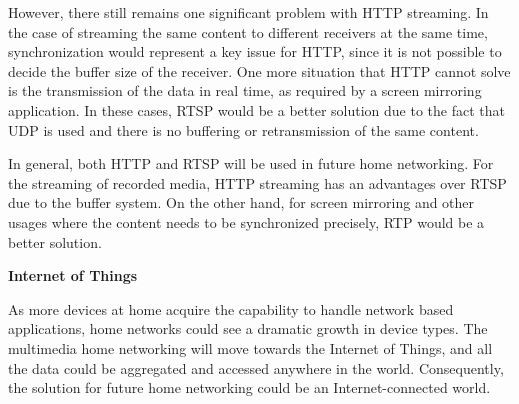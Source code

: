 However, there still remains one significant problem with HTTP streaming. In the
case of streaming the same content to different receivers at the same time,
synchronization would represent a key issue for HTTP, since it is not possible
to decide the buffer size of the receiver. One more situation that HTTP cannot
solve is the transmission of the data in real time, as required by a screen
mirroring application. In these cases, RTSP would be a better solution due to
the fact that UDP is used and there is no buffering or retransmission of the
same content.

In general, both HTTP and RTSP will be used in future home networking. For
the streaming of recorded media, HTTP streaming has an advantages over RTSP
due to the buffer system. On the other hand, for screen mirroring and other
usages where the content needs to be synchronized precisely, RTP would be a
better solution.

\textbf{Internet of Things}

As more devices at home acquire the capability to handle network based
applications, home networks could see a dramatic growth in device types. The
multimedia home networking will move towards the Internet of Things, and all
the data could be aggregated and accessed anywhere in the world. Consequently,
the solution for future home networking could be an Internet-connected
world.
